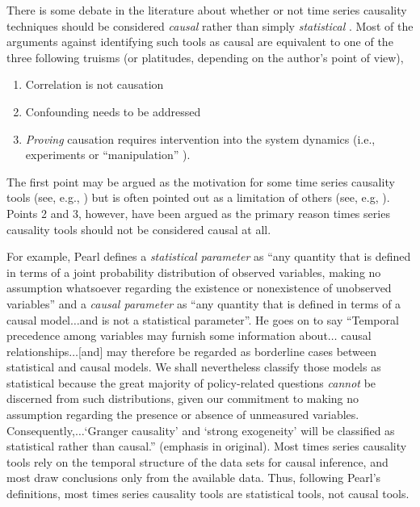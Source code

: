 There is some debate in the literature about whether or not time series causality techniques should be considered {\em causal} rather than simply {\em statistical} \cite{Chen2013,Pearl2000,Bollen2013}.  Most of the arguments against identifying such tools as causal are equivalent to one of the three following truisms (or platitudes, depending on the author's point of view), 
\begin{enumerate}
\item Correlation is not causation
\item Confounding needs to be addressed
\item {\em Proving} causation requires intervention into the system dynamics (i.e., experiments or ``manipulation'' \cite{Holland1986}).
\end{enumerate}
The first point may be argued as the motivation for some time series causality tools (see, e.g., \cite{Granger2003}) but is often pointed out as a limitation of others (see, e.g, \cite{Rogosa1980}).  Points 2 and 3, however, have been argued as the primary reason times series causality tools should not be considered causal at all.  

For example, Pearl \cite{Pearl2000} defines a {\em statistical parameter} as ``any quantity that is defined in terms of a joint probability distribution of observed variables, making no assumption whatsoever regarding the existence or nonexistence of unobserved variables'' and a {\em causal parameter} as ``any quantity that is defined in terms of a causal model$\ldots$and is not a statistical parameter''.  He goes on to say ``Temporal precedence among variables may furnish some information about$\ldots$ causal relationships$\ldots$[and] may therefore be regarded as borderline cases between statistical and causal models.  We shall nevertheless classify those models as statistical because the great majority of policy-related questions {\em cannot} be discerned from such distributions, given our commitment to making no assumption regarding the presence or absence of unmeasured variables.  Consequently,$\ldots$`Granger causality' and `strong exogeneity' will be classified as statistical rather than causal.'' (emphasis in original).  Most times series causality tools rely on the temporal structure of the data sets for causal inference, and most draw conclusions only from the available data. Thus, following Pearl's definitions, most times series causality tools are statistical tools, not causal tools.

